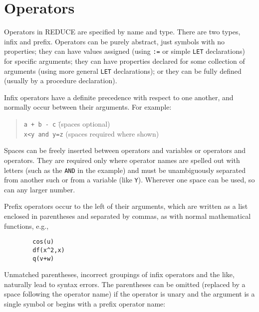 \documentclass[11pt,letterpaper]{book}
\newcommand{\REDUCE}{REDUCE}
\begin{document}
\section{Operators}
\label{sec-operators}

Operators in {\REDUCE} are specified by name and type.
There are two types, infix and prefix.
  Operators can be purely abstract, just symbols
with no properties; they can have values assigned (using {\tt :=} or
simple {\tt LET} declarations) for specific arguments; they can have
properties declared for some collection of arguments (using more general
{\tt LET} declarations); or they can be fully defined (usually by a
procedure declaration).

Infix operators have a definite precedence with
respect to one another, and normally occur between their arguments.
For example:
\begin{quote}
\begin{tabbing}
{\tt a + b - c} \hspace{1.5in} \= (spaces optional) \\
{\tt x<y and y=z} \> (spaces required where shown)
\end{tabbing}
\end{quote}
Spaces can be freely inserted between operators and variables or operators
and operators. They are required only where operator names are spelled out
with letters (such as the {\tt AND} in the example) and must be unambiguously
separated from another such or from a variable (like {\tt Y}). Wherever one
space can be used, so can any larger number.

Prefix operators occur to the left of their arguments, which are written as
a list enclosed in parentheses and separated by commas, as with normal
mathematical functions, e.g.,
{\small\begin{verbatim}
        cos(u)
        df(x^2,x)
        q(v+w)
\end{verbatim}}
Unmatched parentheses, incorrect groupings of infix operators
 and the like, naturally lead to syntax errors.  The
parentheses can be omitted (replaced by a space following the
operator name) if the operator is unary and the argument
is a single symbol or begins with a prefix operator name:
\end{document}
